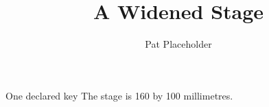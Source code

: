 \documentclass[aspectratio=1610]{slides}
\title{A Widened Stage}
\author{Pat Placeholder}
\date{}
\begin{document}
\begin{frame}{One declared key}
    The stage is 160 by 100 millimetres.
\end{frame}
\end{document}
